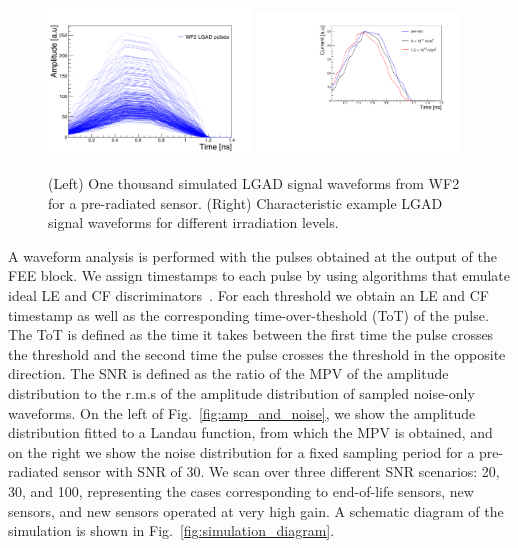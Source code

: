 \documentclass[preprint,1p]{elsarticle}
\begin{document}
 \begin{figure}[htbp]
   \centering
   \includegraphics[width=0.48\textwidth]{figs/lgad_current_pre_rad_all_pulses_v3.pdf} \hfill
   \includegraphics[width=0.48\textwidth]{figs/LGAD_current_all_irradiations_v2.pdf}
   \caption{(Left) One thousand simulated LGAD signal waveforms from WF2 for a pre-radiated sensor.
   (Right) Characteristic example LGAD signal waveforms for different irradiation levels.}
   \label{fig:lgad_current}
 \end{figure}


A waveform analysis is performed with the pulses obtained at the output of the
FEE block. We assign timestamps to each pulse by using algorithms that emulate
ideal LE and CF discriminators~\cite{Spieler}. For each threshold we obtain an LE and CF
timestamp as well as the corresponding time-over-theshold (ToT) of the pulse.
The ToT is defined as the time it takes between the first time the pulse crosses
the threshold and the second time the pulse crosses the threshold in the opposite direction.
The SNR is defined as the ratio of the MPV of the amplitude distribution to the
r.m.s of the amplitude distribution of sampled noise-only waveforms.
On the left of Fig.~\ref{fig:amp_and_noise}, we show the amplitude distribution fitted to a Landau function, from
which the MPV is obtained, and on the right we show the noise distribution for a fixed sampling period for a
pre-radiated sensor with SNR of 30. We scan over three different SNR scenarios: 20, 30, and 100,
representing the cases corresponding to end-of-life sensors, new sensors, and new sensors
operated at very high gain. A schematic diagram of the
simulation is shown in Fig.~\ref{fig:simulation_diagram}.
\end{document}
